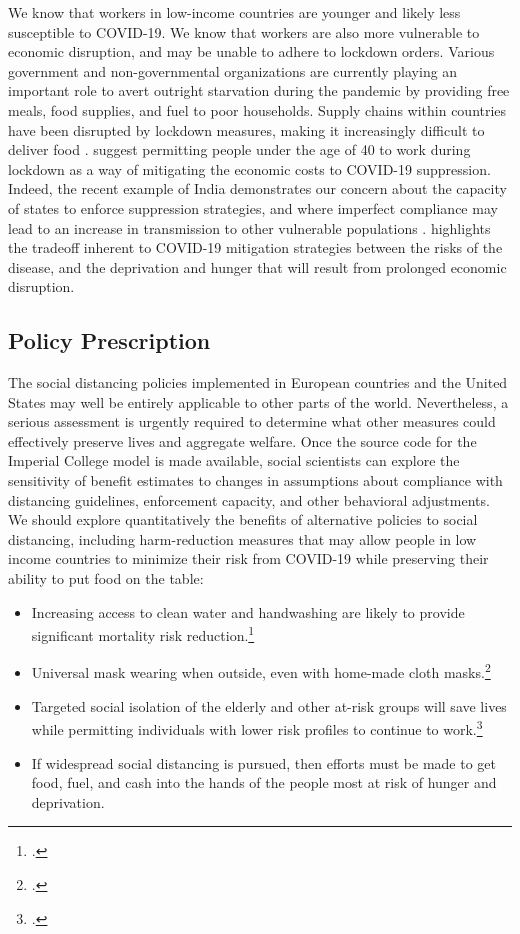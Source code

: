 \documentclass[11pt]{article}
\begin{document}
We know that workers in low-income countries are younger and likely less susceptible to COVID-19. We know that workers are also more vulnerable to economic disruption, and may be unable to adhere to lockdown orders. Various government and non-governmental organizations are currently playing an important role to avert outright starvation during the pandemic by providing free meals, food supplies, and fuel to poor households. Supply chains within countries have been disrupted by lockdown measures, making it increasingly difficult to deliver food \parencite{purohit2020}. \textcite{ray2020} suggest permitting people under the age of 40 to work during lockdown as a way of mitigating the economic costs to COVID-19 suppression. Indeed, the recent example of India demonstrates our concern about the capacity of states to enforce suppression strategies, and where imperfect compliance may lead to an increase in transmission to other vulnerable populations \parencite{scroll2020}. \textcite{ravallion2020} highlights the tradeoff inherent to COVID-19 mitigation strategies between the risks of the disease, and the deprivation and hunger that will result from prolonged economic disruption. 

\subsection{Policy Prescription}

The social distancing policies implemented in European countries and the United States may well be entirely applicable to other parts of the world. Nevertheless, a serious assessment is urgently required to determine what other measures could effectively preserve lives and aggregate welfare. Once the source code for the Imperial College model is made available, social scientists can explore the sensitivity of benefit estimates to changes in assumptions about compliance with distancing guidelines, enforcement capacity, and other behavioral adjustments. We should explore quantitatively the benefits of alternative policies to social distancing, including harm-reduction measures that may allow people in low income countries to minimize their risk from COVID-19 while preserving their ability to put food on the table:

\begin{itemize}
    \item Increasing access to clean water and handwashing are likely to provide significant mortality risk reduction.\footcite{glassman2020}
    \item Universal mask wearing when outside, even with home-made cloth masks.\footcite{abaluck2020}
    \item Targeted social isolation of the elderly and other at-risk groups will save lives while permitting individuals with lower risk profiles to continue to work.\footcite{lshtm2020, favas2020}
    \item If widespread social distancing is pursued, then efforts must be made to get food, fuel, and cash into the hands of the people most at risk of hunger and deprivation.
\end{itemize}
\end{document}
